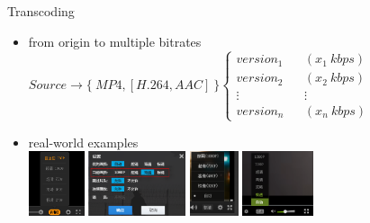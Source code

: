 \documentclass{beamer}
\begin{document}
\begin{frame}{Transcoding} 
\begin{itemize}
	\item<1> from origin to multiple bitrates\\ %
	$ Source \rightarrow \{ ~MP4, [H.264, AAC]~ \}\left\{
	\begin{array}{ccc}
	version_1       &      & {(x_1 ~ kbps)}\\
	version_2     &      & {(x_2 ~ kbps)}\\
	\vdots     &      & {\vdots}\\
	version_n       &      & {(x_n ~ kbps)}
	\end{array} \right. $
	\item<1> real-world examples \\ %
	\includegraphics[height=1.9cm]{fig/bitrate_tencent.png}\hspace*{0.4cm}
	\includegraphics[height=1.9cm]{fig/bitrate_youku.png}\hspace*{0.4cm}
	\includegraphics[height=1.9cm]{fig/bitrate_sohu.png}\hspace*{0.4cm}
	\includegraphics[height=1.9cm]{fig/bitrate_qiyi.png}   
\end{itemize}	
\end{frame}
\end{document}
